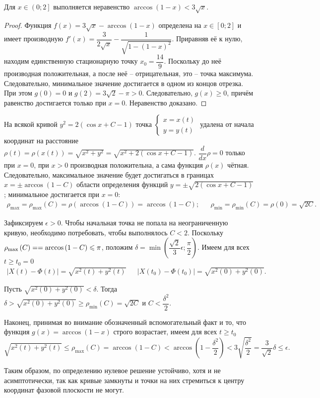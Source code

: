 \documentclass[a5paper,10pt]{article}
\newcommand{\br}[1]{\left(#1\right)}
\newcommand{\vbr}[1]{\left|#1\right|}
\newcommand{\rbr}[1]{\left[#1\right]}
\renewcommand{\le}{\leqslant}
\renewcommand{\ge}{\geqslant}
\begin{document}
\begin{framed}
Для $x \in \left(0; 2\right]$ выполняется неравенство $\arccos\br{1 - x} < 3\sqrt{x}.$
\begin{proof}
    Функция $f\br{x} = 3\sqrt{x} - \arccos\br{1 - x}$ определена    на $x \in \rbr{0; 2}$ и имеет производную $f'\br{x} = \dfrac {3} {2\sqrt{x}} - \dfrac {1} {\sqrt{1 - \br{1 - x}^2}}$. Приравняв её к нулю, находим единственную стационарную точку $x_{0} = \dfrac {14} {9}$. Поскольку до неё производная положительная, а после неё -- отрицательная, это -- точка максимума. Следовательно, минимальное значение достигается в одном из концов отрезка. При этом $g\br{0} = 0$ и $g\br{2} = 3\sqrt{2} - \pi > 0$. Следовательно, $g\br{x} \ge 0$, причём равенство достигается только при $x = 0$. Неравенство доказано.
\end{proof}
\end{framed}

На всякой кривой $y^2 = 2\br{\cos x + C - 1}$ точка $\left\{ \begin{matrix} x = x\br{t} \\ y = y\br{t} \end{matrix} \right.$ удалена от начала координат на расстояние $\rho\br{t} = \rho\br{x\br{t}} = \sqrt{x^2 + y^2} = \sqrt{x^2 + 2\br{\cos{x} + C - 1}}$. $\dfrac {d} {dx} \rho = 0$ только при $x = 0$, при $x > 0$ производная положительна, а сама функция $\rho\br{x}$ чётная. Следовательно, максимальное значение будет достигаться в границах $x = \pm \arccos\br{1 - C}$ области определения функций $y = \pm \sqrt{2\br{\cos{x} + C - 1}}$; минимальное достигается при $x = 0$:
\begin{align*}\rho_{\max} = \rho_{\max}\br{C} = \rho\br{\arccos\br{1 - C}}= \arccos\br{1 - C}; && \rho_{\min} = \rho_{\min}\br{C} = \rho\br{0} = \sqrt{2C}.
\end{align*}

Зафиксируем $\epsilon > 0$. Чтобы начальная точка не попала на неограниченную кривую, необходимо потребовать, чтобы выполнялось $C < 2$. Поскольку $\rho_{\max}\br{C} = \linebreak = \arccos\br{1 - C} \le \pi$, положим $\delta = \min\br{\dfrac {\sqrt{2}} {3} \epsilon; \dfrac {\pi} {2}}$. Имеем для всех $t \ge t_{0} = 0$
\begin{align*}
    \vbr{X\br{t} - \Phi\br{t}} = \sqrt{x^2\br{t} + y^2\br{t}}
    && \vbr{X\br{t_0} - \Phi\br{t_0}} = \sqrt{x^2\br{0} + y^2\br{0}}.
\end{align*}

Пусть $\sqrt{x^2\br{0} + y^2\br{0}} < \delta$. Тогда $\delta > \sqrt{x^2\br{0} + y^2\br{0}} \ge \rho_{\min}\br{C} = \sqrt{2C}$ и $C < \dfrac {\delta^2} {2}$.

Наконец, принимая во внимание обозначенный вспомогательный факт и то, что функция $g\br{x} = \arccos\br{1 - x}$ строго возрастает, имеем для всех $t \ge t_{0}$
$$\sqrt{x^2\br{t} + y^2\br{t}} 
\le \rho_{\max}\br{C} 
= \arccos\br{1 - C}
< \arccos\br{1 - \frac {\delta^2} {2}}
< 3 \sqrt{\frac{\delta^2} {2}}
= \frac {3} {\sqrt{2}}\delta
\le \epsilon.$$

Таким образом, по определению нулевое решение устойчиво, хотя и не асимптотически, так как кривые замкнуты и точки на них стремиться к центру координат фазовой плоскости не могут.
\end{document}
